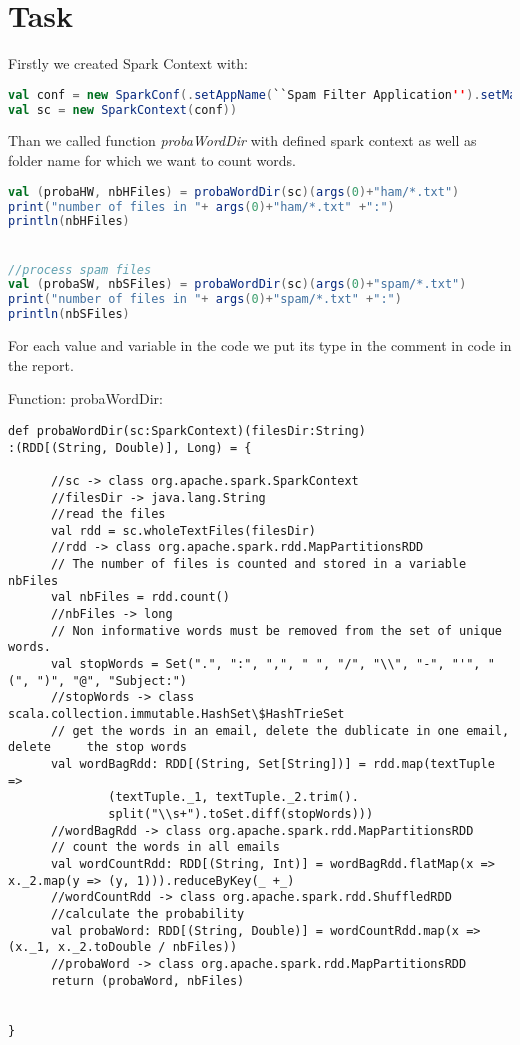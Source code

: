 \documentclass[paper=a4, fontsize=11pt]{scrartcl}
\numberwithin{equation}{section}		%
\numberwithin{figure}{section}			%
\numberwithin{table}{section}				%
\begin{document}
\section{Task}
Firstly we created Spark Context with:
\begin{lstlisting}[language=scala]
val conf = new SparkConf(.setAppName(``Spam Filter Application'').setMaster(``local'')
val sc = new SparkContext(conf))
\end{lstlisting}
Than we called function \textit{probaWordDir} with defined spark context as well as folder name for which we want to count words.
\begin{lstlisting}[language=scala]
val (probaHW, nbHFiles) = probaWordDir(sc)(args(0)+"ham/*.txt")
print("number of files in "+ args(0)+"ham/*.txt" +":")
println(nbHFiles)


//process spam files
val (probaSW, nbSFiles) = probaWordDir(sc)(args(0)+"spam/*.txt")
print("number of files in "+ args(0)+"spam/*.txt" +":")
println(nbSFiles)
\end{lstlisting}

For each value and variable in the code we put its type in the comment in code in the report.

Function: probaWordDir:
\begin{lstlisting}
def probaWordDir(sc:SparkContext)(filesDir:String)
:(RDD[(String, Double)], Long) = {

      //sc -> class org.apache.spark.SparkContext
      //filesDir -> java.lang.String
      //read the files
      val rdd = sc.wholeTextFiles(filesDir)
      //rdd -> class org.apache.spark.rdd.MapPartitionsRDD
      // The number of files is counted and stored in a variable nbFiles
      val nbFiles = rdd.count()
      //nbFiles -> long
      // Non informative words must be removed from the set of unique words.
      val stopWords = Set(".", ":", ",", " ", "/", "\\", "-", "'", "(", ")", "@", "Subject:")
      //stopWords -> class scala.collection.immutable.HashSet\$HashTrieSet
      // get the words in an email, delete the dublicate in one email, delete     the stop words
      val wordBagRdd: RDD[(String, Set[String])] = rdd.map(textTuple =>
              (textTuple._1, textTuple._2.trim().
              split("\\s+").toSet.diff(stopWords)))
      //wordBagRdd -> class org.apache.spark.rdd.MapPartitionsRDD
      // count the words in all emails
      val wordCountRdd: RDD[(String, Int)] = wordBagRdd.flatMap(x => x._2.map(y => (y, 1))).reduceByKey(_ +_)
      //wordCountRdd -> class org.apache.spark.rdd.ShuffledRDD
      //calculate the probability
      val probaWord: RDD[(String, Double)] = wordCountRdd.map(x => (x._1, x._2.toDouble / nbFiles))
      //probaWord -> class org.apache.spark.rdd.MapPartitionsRDD
      return (probaWord, nbFiles)


}
\end{lstlisting}
\end{document}
